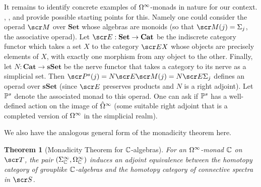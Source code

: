 \documentclass{amsart}
\newtheorem{thm}{Theorem}[section]
\theoremstyle{definition}
\begin{document}
It remains to identify concrete examples of $\Omega^{\infty}$-monads in nature for our context. \cite{Barratt1974oper}, \cite{Barratt1974oper2}, and \cite{gutierrez2012color} provide possible starting points for this. Namely one could consider the operad $\sM$ over $\mathbf{Set}$ whose algebras are monoids (so that $\sM(j)=\SI_j$, the associative operad). Let $\sE : \mathbf{Set} \to \mathbf{Cat}$ be the indiscrete category functor which takes a set $X$ to the category $\sE X$ whose objects are precisely elements of $X$, with exactly one morphism from any object to the other. Finally, let $N : \mathbf{Cat} \to \mathbf{sSet}$ be the nerve functor that takes a category to its nerve as a simplicial set. Then $\sP^s(j) = N \sE \sM(j)=N \sE \SI_j$ defines an operad over $\mathbf{sSet}$ (since $\sE$ preserves products and $N$ is a right adjoint). Let $\mathbb{P}^s$ denote the associated monad to this operad. One can ask if $\mathbb{P}^s$ has a well-defined action on the image of $\hat{\Omega}^{\infty}$ (some suitable right adjoint that is a completed version of $\Omega^{\infty}$ in the simplicial realm).

We also have the analogous general form of the monadicity theorem here.

\begin{thm}[Monadicity Theorem for $\mathbb{C}$-algebras]
For an $\Omega^{\infty}$-monad $\mathbb{C}$ on $\sT$, the pair $(\Sigma^{\infty}_{\mathbb{C}},\Omega^{\infty}_{\mathbb{C}})$ induces an adjoint equivalence between the homotopy category of grouplike $\mathbb{C}$-algebras and the homotopy category of connective spectra in $\sS$.
\end{thm}

\nocite{*}

\printbibliography
\end{document}
